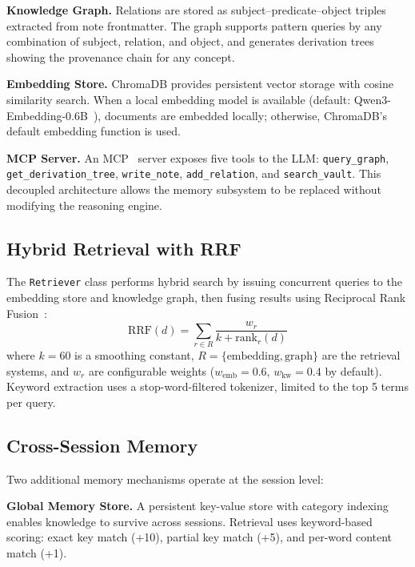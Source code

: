 \documentclass[conference]{IEEEtran}
\begin{document}
\textbf{Knowledge Graph.} Relations are stored as subject--predicate--object triples extracted from note frontmatter. The graph supports pattern queries by any combination of subject, relation, and object, and generates derivation trees showing the provenance chain for any concept.

\textbf{Embedding Store.} ChromaDB provides persistent vector storage with cosine similarity search. When a local embedding model is available (default: Qwen3-Embedding-0.6B~\cite{qwen2024}), documents are embedded locally; otherwise, ChromaDB's default embedding function is used.

\textbf{MCP Server.} An MCP~\cite{anthropic2024mcp} server exposes five tools to the LLM: \texttt{query\_graph}, \texttt{get\_derivation\_tree}, \texttt{write\_note}, \texttt{add\_relation}, and \texttt{search\_vault}. This decoupled architecture allows the memory subsystem to be replaced without modifying the reasoning engine.

\subsection{Hybrid Retrieval with RRF}

The \texttt{Retriever} class performs hybrid search by issuing concurrent queries to the embedding store and knowledge graph, then fusing results using Reciprocal Rank Fusion~\cite{cormack2009reciprocal}:
\begin{equation}
\text{RRF}(d) = \sum_{r \in R} \frac{w_r}{k + \text{rank}_r(d)}
\label{eq:rrf}
\end{equation}
where $k{=}60$ is a smoothing constant, $R = \{\text{embedding}, \text{graph}\}$ are the retrieval systems, and $w_r$ are configurable weights ($w_{\text{emb}} {=} 0.6$, $w_{\text{kw}} {=} 0.4$ by default). Keyword extraction uses a stop-word-filtered tokenizer, limited to the top 5 terms per query.

\subsection{Cross-Session Memory}

Two additional memory mechanisms operate at the session level:

\textbf{Global Memory Store.} A persistent key-value store with category indexing enables knowledge to survive across sessions. Retrieval uses keyword-based scoring: exact key match (+10), partial key match (+5), and per-word content match (+1).
\end{document}
